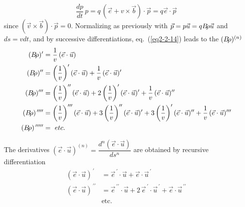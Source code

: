 \begin{equation}
	\dfrac{dp }{ dt} \,p =  q\,(\vec  e + v\times\vec  b)\cdot \vec  p =q\vec  e \cdot \vec  p
	\label{eq2-2-14}
\end{equation}
%
since $ (\vec  v\times\vec  b) \cdot \vec  p=0$.  Normalizing as
previously with $ \vec  p=p\vec  u=qB\!\rho\vec  u $ and $ ds=vdt$,  and 
by successive differentiations, eq.~(\ref{eq2-2-14}) leads to the $ (B\!\rho )^{(n)} $
%
\begin{equation}
	\begin{aligned}
		(B\!\rho )^\prime 
		      & =  \dfrac{ 1 }{ v}\, (\vec  e \cdot \vec  u) \\
		(B\!\rho)^{\prime\prime}
		      & =  \left(\dfrac{1 }{ v}\right)^\prime
		        (\vec  e \cdot \vec  u) +
		        \dfrac{1 }{ v}\, (\vec  e\cdot\vec  u)^\prime \\
		(B\!\rho )^{\prime\prime\prime}
		      & =  \left(\dfrac{1 }{ v}\right)^{\prime\prime} (\vec  e\cdot\vec  u)
		        +2\left(\dfrac{1 }{v}\right)^\prime (\vec  e\cdot\vec  u)^\prime 
		        +\dfrac{1 }{ v}\, (\vec  e\cdot\vec u)^{\prime\prime} \\
	    (B\!\rho )^{\,\prime\prime\prime\prime} 
	          & =  \left(\dfrac{1 }{v}\right)^{\prime\prime\prime} (\vec  e\cdot\vec  u)
	            +3\left(\dfrac{1 }{ v}\right)^{\prime\prime}(\vec  e\cdot\vec  u)^\prime 
	            +3\left(\dfrac{1 }{ v}\right)^\prime (\vec  e\cdot\vec u)^{\prime\prime} 
	            + \dfrac{1 }{ v}\, (\vec  e\cdot\vec  u)^{\prime\prime\prime} \\
	    (B\!\rho )^{\,\prime\prime\prime\prime\prime} 
                 & = ~ etc.
	\end{aligned}
	\label{eq2-2-15}
\end{equation}

\noindent The derivatives $ (\vec  e \cdot \vec  u)^{(n)} = 
\dfrac{ d^n(\vec e\cdot\vec  u) }{ ds^n} $ are obtained by recursive differentiation
\begin{equation}
	\begin{aligned}
	 (\vec e\cdot\vec  u)^{\,\prime}
		         &   =   \vec  e^{\,\prime}   \cdot   \vec u  + \vec  e  \cdot \vec u^{\,\prime} \\
	(\vec e\cdot\vec  u)^{\,\prime\prime}
		        &   =   \vec  e^{\,\prime\prime}   \cdot   \vec u  + 
		              2\, \vec  e^{\,\prime}   \cdot   \vec u^{\,\prime} +
		            \vec  e  \cdot \vec u^{\,\prime\prime}   \\
                ~  & \textrm{etc.}
	\label{eqEscalu}
	\end{aligned}
\end{equation}


